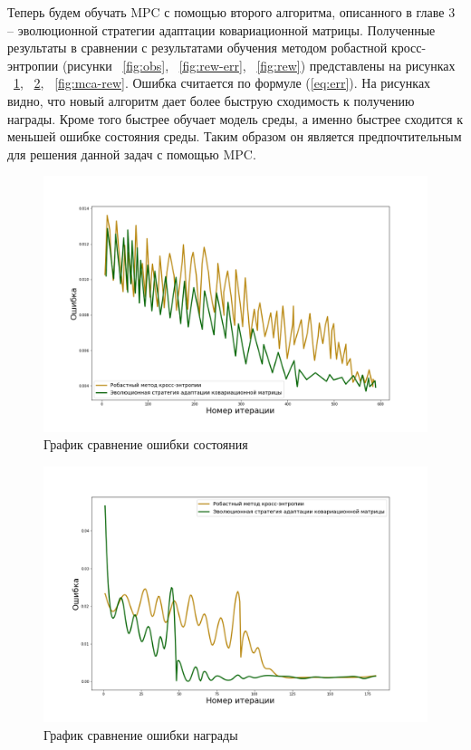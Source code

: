 Теперь будем обучать MPC с помощью второго алгоритма, описанного в главе 3 -- эволюционной стратегии адаптации ковариационной матрицы. Полученные результаты в сравнении с результатами обучения методом робастной кросс-энтропии (рисунки ~\ref{fig:obs}, ~\ref{fig:rew-err}, ~\ref{fig:rew}) представлены на рисунках ~\ref{fig:mca-obs}, ~\ref{fig:mca-rew-err}, ~\ref{fig:mca-rew}. Ошибка считается по формуле (\ref{eq:err}). На рисунках видно, что новый алгоритм дает более быструю сходимость к получению награды. Кроме того быстрее обучает модель среды, а именно быстрее сходится к меньшей ошибке состояния среды. Таким образом он является предпочтительным для решения данной задач с помощью MPC. \newpage

\begin{figure}[!h]
	\centering
	\includegraphics[scale=0.44]{mca_obs.png}
	\caption {График сравнение ошибки состояния}
	\label{fig:mca-obs}
\end{figure}



\begin{figure}[!h]
	\centering
	\includegraphics[scale=0.44]{mca_rew_err.png}
	\caption {График сравнение ошибки награды}
	\label{fig:mca-rew-err}
\end{figure}


